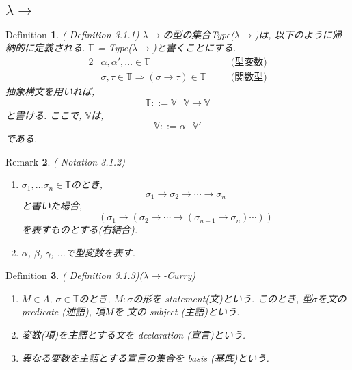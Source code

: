 \documentclass[11pt]{jsreport}
\theoremstyle{mystyle}
\newtheorem{df}{$\textrm{Definition}$}[subsection]
\newtheorem{rmk}[df]{$\textrm{Remark}$}
\newcommand{\T}{\mathbb{T}}
\newcommand{\V}{\mathbb{V}}
\newcommand{\lama}{\lambda \! \! \to}
\newcommand{\0}{\textbf{0}}
\newcommand{\1}{\textbf{1}}
\newcommand{\2}{\textbf{2}}
\begin{document}
\subsection*{$\lama$}
\begin{shadebox}
  \begin{df}{(\cite{Bar} Definition 3.1.1)}
    $\lama$の型の集合Type($\lama$)は, 以下のように帰納的に定義される. 
    $\T$ = Type($\lama$)と書くことにする. 
    \begin{alignat*}{2}
      &\alpha, \alpha',\ldots \in \T& &\text{(型変数)}\\
      &\sigma, \tau \in \T \Rightarrow (\sigma \to \tau) \in \T&  \quad &\text{(関数型)}
    \end{alignat*}
    抽象構文を用いれば, 
    \[
      \T ::= \V \ |\ \V \to \V
    \]
    と書ける. ここで, $\V$は, 
    \[
      \V ::= \alpha \ | \ \V'
    \]
    である.
  \end{df}
\end{shadebox}
\begin{rmk}{(\cite{Bar} Notation 3.1.2)}
  \begin{enumerate}
    \item $\sigma_{1}, \ldots \sigma_{n} \in \T$のとき, 
      \[
        \sigma_1 \to \sigma_2 \to \cdots \to \sigma_n
      \]
      と書いた場合, 
      \[
        (\sigma_1 \to (\sigma_2 \to \cdots \to (\sigma_{n-1} \to \sigma_n) \cdots ))
      \]
      を表すものとする(右結合).
    \item $\alpha$, $\beta$, $\gamma$, $\ldots$で型変数を表す. 
  \end{enumerate}
\end{rmk}
\begin{shadebox}
  \begin{df}{(\cite{Bar} Definition 3.1.3)}($\lama$-Curry)
    \begin{enumerate}
      \item $M \in \Lambda$, $\sigma \in \T$のとき, $M \colon \sigma$の形を
        statement(文)という. このとき, 型$\sigma$を文の predicate (述語), 項$M$を
        文の subject (主語)という. 
      \item 変数(項)を主語とする文を declaration (宣言)という.
      \item 異なる変数を主語とする宣言の集合を basis (基底)という.
    \end{enumerate}
  \end{df}
\end{shadebox}
\end{document}
